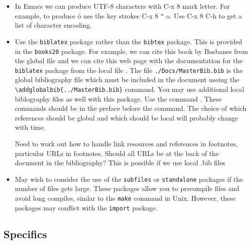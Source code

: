 \begin{itemize}
{  This will be useful when I create \LaTeXe\ files from the database
  which is in UTF-8 encoding.
}

\item In Emacs we can produce UTF-8 characters with C-x 8 mark letter.
  For example, to produce ö use the key strokes C-x 8 \verb|"| o. Use C-x 8 C-h
  to get a list of character encoding.
  
\item Use the \texttt{biblatex} package rather than the
  \texttt{bibtex} package. This is provided in the \texttt{books20}
  package.  For example, we can cite this book by Basbanes
  \cite{basbanes:2003} from the global file and we can cite this web
  page with the documentation for the \texttt{biblatex} package
  \cite{Lehman2018} from the local file . The file
  \texttt{./Docs/MasterBib.bib} is the global bibliography file which
  must be included in the document useing the
  \verb|\addglobalbib{../MasterBib.bib}| command. You may use
  additional local biblography files as well with this package. Use
  the command \verb||. These commands
  should be in the preface before the \verb||
    command. The choice of which references should be global and which
    should be local will probably change with time.

  Need to work out how to handle link resources and references in
  footnotes, particular URLs in footnotes. Should all URLs be at the back
  of the document in the bibliography?  This is possible if we use local
  .bib files
  
\item May wish to consider the use of the \texttt{subfiles} or
  \texttt{standalone} packages if the number of files gets
  large. These packages allow you to precompile files and avoid long
  compiles, simlar to the \texttt{make} command in Unix.  However,
  these packages may conflict with the \texttt{import} package.


\end{itemize}

\subsection{Specifics}

